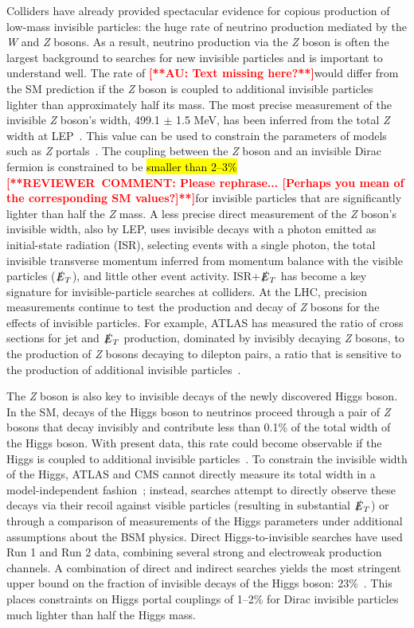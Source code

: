 \documentclass{ar-1col}
\newcommand{\IP}{invisible particle}
\newcommand{\MET}{\ensuremath{\slashed{E}_T}\xspace}
\begin{document}
Colliders have already provided spectacular evidence for copious production of low-mass invisible particles: the huge rate of neutrino production
mediated by the \textit{W} and \textit{Z} bosons. As a result, neutrino production via the \textit{Z}
boson is often the largest background to searches for new {\IP}s
and is important to understand well. The rate of \textbf{\textcolor{red}{[**AU: Text missing here?**]}}would differ from
the SM prediction if the \textit{Z} boson is coupled to additional {\IP}s
lighter than approximately half its mass. The most precise measurement of
the invisible \textit{Z} boson's width, 499.1 $\pm$ 1.5 MeV, has been inferred from
the total  \textit{Z}
width at LEP~\cite{ALEPH:2005ab}. This value can be used to
constrain the parameters of models such as \textit{Z}
portals~\cite{Carena:2003aj,Escudero:2016gzx}. The coupling
between the \textit{Z} boson and an invisible Dirac fermion is constrained to be
\hl{smaller than 2--3\%} \textbf{\textcolor{red}{[**REVIEWER\ COMMENT: Please rephrase...  [Perhaps you mean of the corresponding SM values?]**]}}for {\IP}s that are significantly lighter than
half the \textit{Z} mass. A less precise direct measurement of the \textit{Z} boson's
invisible width, also by LEP, uses invisible decays with a photon
emitted as initial-state radiation (ISR), selecting events with a
single photon, the total invisible transverse momentum inferred
from momentum balance with the visible particles (\MET), and
little other event activity.  ISR+\MET has become a key
signature for invisible-particle searches at colliders. At the
LHC, precision measurements continue to test the production and
decay of \textit{Z} bosons for the effects of {\IP}s. For example, ATLAS
has measured the ratio of cross sections for jet and \MET
production, dominated by invisibly decaying \textit{Z} bosons, to
the production of \textit{Z} bosons decaying to dilepton pairs, a ratio that
is sensitive to the production of additional
{\IP}s~\cite{Aaboud:2017buf}.

The \textit{Z} boson is also key to invisible decays of the
newly discovered Higgs boson. In the SM, decays of the Higgs boson to neutrinos proceed through a pair of \textit{Z} bosons that decay invisibly and contribute less than 0.1\% of the total width of the Higgs boson. With
present data, this rate could become observable if the Higgs is
coupled to additional
{\IP}s~\cite{Khachatryan:2016vau,Aad:2015pla}. To constrain the
invisible width of the Higgs, ATLAS and CMS cannot directly
measure its total width in a model-independent
fashion~\cite{Dobrescu:2012td}; instead, searches attempt to
directly observe these decays via their recoil against visible
particles (resulting in substantial \MET) or through a comparison of measurements of the
Higgs parameters under additional assumptions about the BSM
physics. Direct Higgs-to-invisible searches have used Run 1 and
Run 2 data, combining several strong and electroweak production
channels. A combination of direct and indirect searches yields the most
stringent upper bound on the fraction of invisible decays of the Higgs
boson: 23\%~\cite{Khachatryan:2016whc,Aad:2015pla}. This places
constraints on Higgs portal couplings of 1--2\% for Dirac {\IP}s
much lighter than half the Higgs mass.
\end{document}
